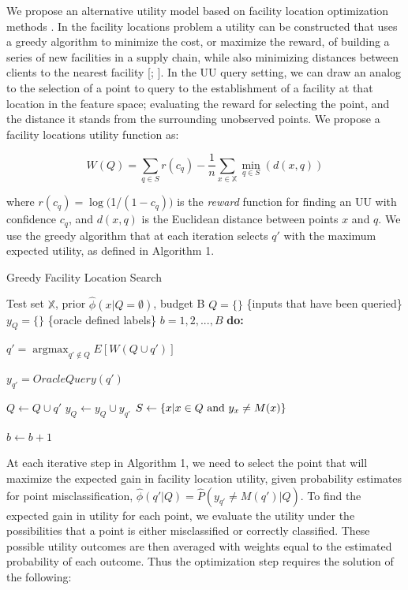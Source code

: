\documentclass[letterpaper]{article} %
\DeclareMathOperator*{\argmax}{argmax}
\begin{document}
We propose an alternative utility model based on facility location optimization methods  \citep{farahani2009facility}. In the facility locations problem a utility can be constructed that uses a greedy algorithm to minimize the cost, or maximize the reward, of building a series of new facilities in a supply chain, while also minimizing distances between clients to the nearest facility  [\citealt{guha1999greedy}; \citealt{arya2004local}]. In the UU query setting, we can draw an analog to the selection of a point to query to the establishment of a facility at that location in the feature space; evaluating the reward for selecting the point, and the distance it stands from the surrounding unobserved points. We propose a facility locations utility function as: 

$$W(Q) = \sum_{q \in S} r \left(c_q\right) - \frac{1}{n} \sum_{x \in \mathbb{X}} \min_{q \in S}\left(d\left(x,q\right)\right)$$

where $r\left(c_q\right) = \log($1/$(1-c_q))$ is the \textit{reward} function for finding an UU with confidence $c_{q}$, and $d(x,q)$ is the Euclidean distance between points $x$ and $q$. We use the greedy algorithm that at each iteration selects $q'$ with the maximum expected utility, as defined in Algorithm 1. 

\begin{algorithm}
	\caption{Greedy Facility Location Search}
	\label{alg:Greedy}
	\begin{algorithmic}
		 Test set $\mathbb{X}$, prior $\hat{\phi}\left(x|Q=\emptyset\right)$, budget B
		\STATE $Q=\{\}$ \{inputs that have been queried\}
		\STATE $y_Q = \{\}$ \{oracle defined labels\}
		 $b = 1, 2, ..., B$ {\bfseries do:}

		\STATE $q' = \argmax_{q' \not\in Q} E \left[W\left(Q \cup q'\right) \right]$

		\STATE $y_{q'} = OracleQuery(q')$

		\STATE $Q \leftarrow Q \cup q'$
		\STATE $y_Q \leftarrow y_Q \cup y_{q'}$
		\STATE $S \leftarrow \left\{x | x \in Q \space \text{ and } y_x \neq M(x) \right\}$

		\STATE $b \leftarrow b + 1$
			

	\end{algorithmic}
\end{algorithm}

At each iterative step in Algorithm 1, we need to select the point that will maximize the expected gain in facility location utility, given probability estimates for point misclassification, $\hat{\phi}(q' | Q) = \hat{P}(y_{q'} \ne M(q' ) |  Q )$. To find the expected gain in utility for each point, we evaluate the utility under the possibilities that a point is either misclassified or correctly classified. These possible utility outcomes are then averaged with weights equal to the estimated probability of each outcome. Thus the optimization step requires the solution of the following:
\end{document}
